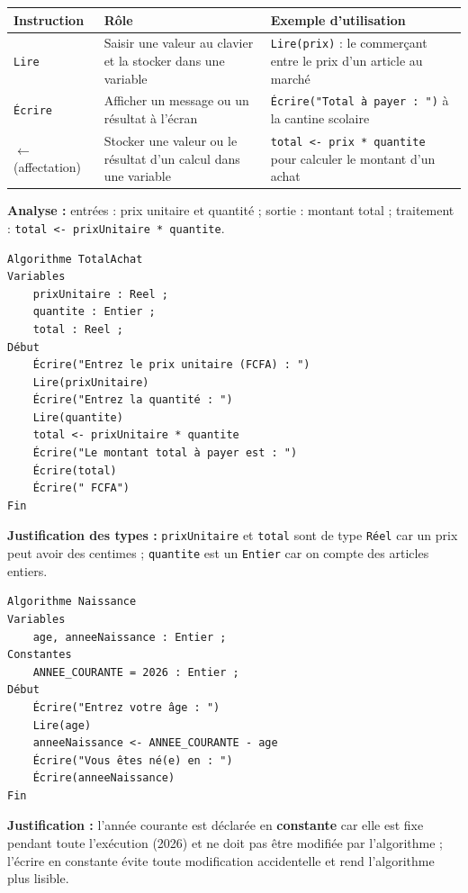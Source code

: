 \documentclass[11pt]{article}
\begin{document}
\begin{corrige}
\begin{center}
\begin{tabularx}{\linewidth}{|l|X|X|}
\hline
\rowcolor{popblueL} \textbf{Instruction} & \textbf{Rôle} & \textbf{Exemple d'utilisation} \\
\hline
\texttt{Lire} & Saisir une valeur au clavier et la stocker dans une variable & \texttt{Lire(prix)} : le commerçant entre le prix d'un article au marché \\
\hline
\texttt{Écrire} & Afficher un message ou un résultat à l'écran & \texttt{Écrire("Total à payer : ")} à la cantine scolaire \\
\hline
$\leftarrow$ (affectation) & Stocker une valeur ou le résultat d'un calcul dans une variable & \texttt{total <- prix * quantite} pour calculer le montant d'un achat \\
\hline
\end{tabularx}
\end{center}
\end{corrige}

\begin{corrige}
\textbf{Analyse :} entrées : prix unitaire et quantité ; sortie : montant total ; traitement : \texttt{total <- prixUnitaire * quantite}.
\begin{lstlisting}
Algorithme TotalAchat
Variables
    prixUnitaire : Reel ;
    quantite : Entier ;
    total : Reel ;
Début
    Écrire("Entrez le prix unitaire (FCFA) : ")
    Lire(prixUnitaire)
    Écrire("Entrez la quantité : ")
    Lire(quantite)
    total <- prixUnitaire * quantite
    Écrire("Le montant total à payer est : ")
    Écrire(total)
    Écrire(" FCFA")
Fin
\end{lstlisting}
\textbf{Justification des types :} \texttt{prixUnitaire} et \texttt{total} sont de type \texttt{Réel} car un prix peut avoir des centimes ; \texttt{quantite} est un \texttt{Entier} car on compte des articles entiers.
\end{corrige}

\begin{corrige}
\begin{lstlisting}
Algorithme Naissance
Variables
    age, anneeNaissance : Entier ;
Constantes
    ANNEE_COURANTE = 2026 : Entier ;
Début
    Écrire("Entrez votre âge : ")
    Lire(age)
    anneeNaissance <- ANNEE_COURANTE - age
    Écrire("Vous êtes né(e) en : ")
    Écrire(anneeNaissance)
Fin
\end{lstlisting}
\textbf{Justification :} l'année courante est déclarée en \textbf{constante} car elle est fixe pendant toute l'exécution (2026) et ne doit pas être modifiée par l'algorithme ; l'écrire en constante évite toute modification accidentelle et rend l'algorithme plus lisible.
\end{corrige}
\end{document}
